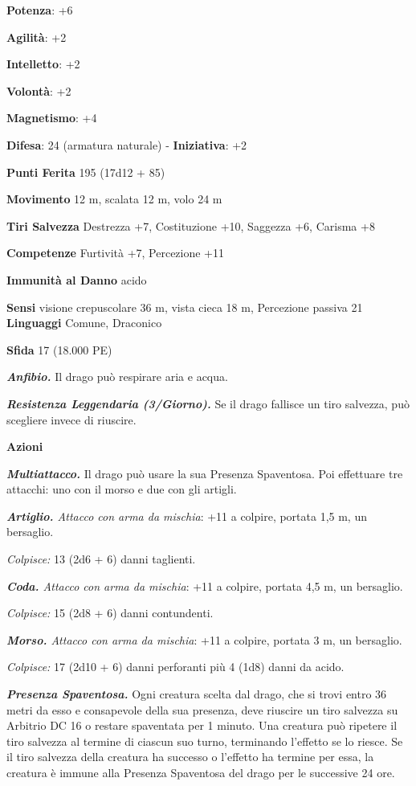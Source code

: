 \begin{multicols}{2}
\textbf{Potenza}: +6

\textbf{Agilità}: +2

\textbf{Intelletto}: +2

\textbf{Volontà}: +2

\textbf{Magnetismo}: +4

\textbf{Difesa}: 24 (armatura naturale) - \textbf{Iniziativa}: +2

\textbf{Punti Ferita} 195 (17d12 + 85)

\textbf{Movimento} 12 m, scalata 12 m, volo 24 m

\textbf{Tiri Salvezza} Destrezza +7, Costituzione +10, Saggezza +6,
Carisma +8

\textbf{Competenze} Furtività +7, Percezione +11

\textbf{Immunità al Danno} acido

\textbf{Sensi} visione crepuscolare 36 m, vista cieca 18 m, Percezione passiva
21 \textbf{Linguaggi} Comune, Draconico

\textbf{Sfida} 17 (18.000 PE)

\emph{\textbf{Anfibio.}} Il drago può respirare aria e acqua.

\emph{\textbf{Resistenza Leggendaria (3/Giorno).}} Se il drago fallisce
un tiro salvezza, può scegliere invece di riuscire.

\textbf{Azioni}

\emph{\textbf{Multiattacco.}} Il drago può usare la sua Presenza
Spaventosa. Poi effettuare tre attacchi: uno con il morso e due con gli
artigli.

\emph{\textbf{Artiglio.} Attacco con arma da mischia}: +11 a colpire,
portata 1,5 m, un bersaglio.

\emph{Colpisce:} 13 (2d6 + 6) danni taglienti.

\emph{\textbf{Coda.} Attacco con arma da mischia}: +11 a colpire,
portata 4,5 m, un bersaglio.

\emph{Colpisce:} 15 (2d8 + 6) danni contundenti.

\emph{\textbf{Morso.} Attacco con arma da mischia}: +11 a colpire,
portata 3 m, un bersaglio.

\emph{Colpisce:} 17 (2d10 + 6) danni perforanti più 4 (1d8) danni da
acido.

\emph{\textbf{Presenza Spaventosa.}} Ogni creatura scelta dal drago, che
si trovi entro 36 metri da esso e consapevole della sua presenza, deve
riuscire un tiro salvezza su Arbitrio DC 16 o restare spaventata per 1
minuto. Una creatura può ripetere il tiro salvezza al termine di ciascun
suo turno, terminando l'effetto se lo riesce. Se il tiro salvezza della
creatura ha successo o l'effetto ha termine per essa, la creatura è
immune alla Presenza Spaventosa del drago per le successive 24 ore.


\end{multicols}
